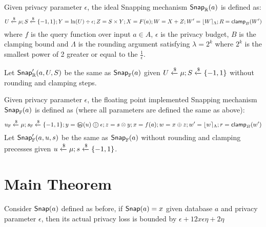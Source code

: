 \documentclass[a4paper,11pt]{article}
\begin{document}
\begin{defn}
Given privacy parameter $\epsilon$, the ideal Snapping mechanism $\mathsf{Snap}_{\mathbb{R}}(a)$ is defined as:
\[
	U \xleftarrow{\$} \mu; S \xleftarrow{\$} \{-1, 1\}; Y = \ln (U) \div \epsilon; Z = S \times Y; X = F(a); W = X + Z; W' = \lfloor W \rceil_{\Lambda}; R = \mathsf{clamp}_B (W')
\]
where $f$ is the query function over input $a \in A$, $\epsilon$ is the privacy budget, $B$ is the clamping bound and $\Lambda$ is the rounding argument satisfying $\lambda = 2^k$ where $2^k$ is the smallest power of 2 greater or equal to the $\frac{1}{\epsilon}$.
%

%
Let $\mathsf{Snap}_{\mathbb{R}}'(a, U, S)$ be the same as $\mathsf{Snap}_{\mathbb{F}}(a)$ given $U \xleftarrow{\$} \mu; S \xleftarrow{\$} \{-1, 1\}$ without rounding and clamping steps.
\end{defn}


\begin{defn}
Given privacy parameter $\epsilon$, the floating point implemented Snapping mechanism $\mathsf{Snap}_{\mathbb{F}}(a)$ is defined as (where all parameters are defined the same as above):
\[
	u_{\mathbb{F}} \xleftarrow{\$} \edistr; s_{\mathbb{F}} \samplel \{-1, 1\}; y = \oln (u) \odiv \epsilon; z = s \otimes y; x = f(a); w = x \oplus z; w' = \round{w}_{\Lambda}; r = \clamp_B (w')
\]
Let $\mathsf{Snap}_{\mathbb{F}}'(a, u, s)$ be the same as $\mathsf{Snap}_{\mathbb{F}}(a)$ without rounding and clamping precesses given $u \xleftarrow{\$} \mu; s \xleftarrow{\$} \{-1, 1\}$.
\end{defn}




\section{Main Theorem}

\begin{thm}
Consider $\mathsf{Snap}(a)$ defined as before, if $\mathsf{Snap}(a) = x$ given database $a$ and privacy parameter $\epsilon$, then its actual privacy loss is bounded by $\epsilon + 12 x \epsilon \eta + 2\eta$
\end{thm}
\end{document}
